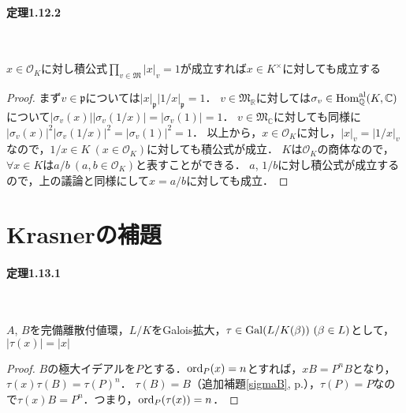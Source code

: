 \paragraph{定理1.12.2}~
\begin{screen}
  $x\in\mathcal{O}_K$に対し積公式$\prod_{v\in\mathfrak{M}}\lvert x\rvert _v=1$が成立すれば$x\in K^\times$に対しても成立する
\end{screen}
\begin{proof}
  まず$v\in\mathfrak{p}$については$\lvert x\rvert _\mathfrak{p}\lvert 1/x\rvert _\mathfrak{p}=1$．
  $v\in\mathfrak{M}_\mathbb{R}$に対しては$\sigma_v\in\operatorname{Hom}^\text{al}_\mathbb{Q}(K,\mathbb{C})$について$\lvert\sigma_v(x)\rvert\lvert\sigma_v(1/x)\rvert=\lvert\sigma_v(1)\rvert=1$．
  $v\in\mathfrak{M}_\mathbb{C}$に対しても同様に$\lvert\sigma_v(x)\rvert^2\lvert\sigma_v(1/x)\rvert^2=\lvert\sigma_v(1)\rvert^2=1$．
  以上から，$x\in\mathcal{O}_K$に対し，$\lvert x\rvert _v=\lvert 1/x\rvert _v$なので，$1/x\in K\ (x\in\mathcal{O}_K)$に対しても積公式が成立．
  $K$は$\mathcal{O}_K$の商体なので，$\forall x\in K$は$a/b\ (a,b\in\mathcal{O}_K)$と表すことができる．
  $a$, $1/b$に対し積公式が成立するので，上の議論と同様にして$x=a/b$に対しても成立．
\end{proof}

\section{Krasnerの補題}

\paragraph{定理1.13.1}~
\begin{screen}
  $A$, $B$を完備離散付値環，$L/K$をGalois拡大，$\tau\in\operatorname{Gal}(L/K(\beta))\ (\beta\in L)$として，$\lvert\tau(x)\rvert=\lvert x\rvert$
\end{screen}
\begin{proof}
  $B$の極大イデアルを$P$とする．$\operatorname{ord}_P(x)=n$とすれば，$xB=P^nB$となり，$\tau(x) \tau(B) = \tau(P)^n$．
  $\tau(B)=B$（追加補題\ref{sigmaB}, p.\pageref{sigmaB}），$\tau(P)=P$なので$\tau(x)B=P^n$．つまり，$\operatorname{ord}_P(\tau(x))=n$．
\end{proof}

